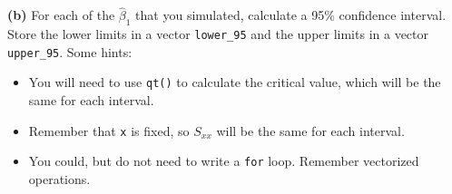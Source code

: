 \documentclass[
]{article}
\newenvironment{Shaded}{\begin{snugshade}}{\end{snugshade}}
\newcommand{\CommentTok}[1]{\textcolor[rgb]{0.56,0.35,0.01}{\textit{#1}}}
\newcommand{\ControlFlowTok}[1]{\textcolor[rgb]{0.13,0.29,0.53}{\textbf{#1}}}
\newcommand{\DataTypeTok}[1]{\textcolor[rgb]{0.13,0.29,0.53}{#1}}
\newcommand{\DecValTok}[1]{\textcolor[rgb]{0.00,0.00,0.81}{#1}}
\newcommand{\FloatTok}[1]{\textcolor[rgb]{0.00,0.00,0.81}{#1}}
\newcommand{\KeywordTok}[1]{\textcolor[rgb]{0.13,0.29,0.53}{\textbf{#1}}}
\newcommand{\NormalTok}[1]{#1}
\newcommand{\OperatorTok}[1]{\textcolor[rgb]{0.81,0.36,0.00}{\textbf{#1}}}
\newcommand{\StringTok}[1]{\textcolor[rgb]{0.31,0.60,0.02}{#1}}
\providecommand{\tightlist}{%
  \setlength{\itemsep}{0pt}\setlength{\parskip}{0pt}}
\begin{document}
\begin{Shaded}
\end{Shaded}

\textbf{(b)} For each of the \(\hat{\beta}_1\) that you simulated,
calculate a 95\% confidence interval. Store the lower limits in a vector
\texttt{lower\_95} and the upper limits in a vector \texttt{upper\_95}.
Some hints:

\begin{itemize}
\tightlist
\item
  You will need to use \texttt{qt()} to calculate the critical value,
  which will be the same for each interval.
\item
  Remember that \texttt{x} is fixed, so \(S_{xx}\) will be the same for
  each interval.
\item
  You could, but do not need to write a \texttt{for} loop. Remember
  vectorized operations.
\end{itemize}
\end{document}
